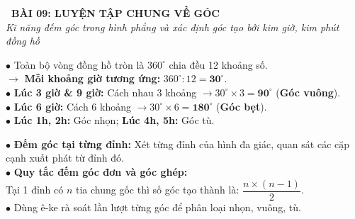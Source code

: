 \documentclass[14pt,a4paper,oneside]{extbook}
\begin{document}
\noindent
\begin{tcolorbox}[
  enhanced,
  colback=teal!8!white,
  colframe=teal!80!black,
  arc=3mm, boxrule=1pt,
  left=3mm, right=3mm, top=2mm, bottom=2mm,
  halign=center
]
  {\Large\bfseries\color{teal!90!black}\faBookmark\ BÀI 09: LUYỆN TẬP CHUNG VỀ GÓC}\\[1.5pt]
  {\footnotesize\itshape\color{black!75} Kĩ năng đếm góc trong hình phẳng và xác định góc tạo bởi kim giờ, kim phút đồng hồ}
\end{tcolorbox}

\vspace{2.5mm}

\noindent
\begin{minipage}[t]{0.49\textwidth}
  \begin{tcolorbox}[
    enhanced,
    title={\footnotesize\bfseries\color{white}\faClockO\ 1. Góc trên mặt đồng hồ},
    colback=blue!2!white,
    colframe=blue!75!black,
    arc=2.5mm, boxrule=0.8pt, top=1.8mm, bottom=1.8mm, left=2mm, right=2mm
  ]
    \footnotesize
    $\bullet$ Toàn bộ vòng đồng hồ tròn là $360^\circ$ chia đều 12 khoảng số.\\
    $\rightarrow$ \textbf{Mỗi khoảng giờ tương ứng:} $360^\circ : 12 = \textbf{30}^\circ$.\\
    $\bullet$ \textbf{Lúc 3 giờ \& 9 giờ:} Cách nhau 3 khoảng $\rightarrow 30^\circ \times 3 = \textbf{90}^\circ$ (\textbf{Góc vuông}).\\
    $\bullet$ \textbf{Lúc 6 giờ:} Cách 6 khoảng $\rightarrow 30^\circ \times 6 = \textbf{180}^\circ$ (\textbf{Góc bẹt}).\\
    $\bullet$ \textbf{Lúc 1h, 2h:} Góc nhọn; \textbf{Lúc 4h, 5h:} Góc tù.
  \end{tcolorbox}
\end{minipage}%
\hfill
\begin{minipage}[t]{0.49\textwidth}
  \begin{tcolorbox}[
    enhanced,
    title={\footnotesize\bfseries\color{white}\faObjectGroup\ 2. Kĩ thuật đếm góc trong hình},
    colback=teal!2!white,
    colframe=teal!75!black,
    arc=2.5mm, boxrule=0.8pt, top=1.8mm, bottom=1.8mm, left=2mm, right=2mm
  ]
    \footnotesize
    $\bullet$ \textbf{Đếm góc tại từng đỉnh:} Xét từng đỉnh của hình đa giác, quan sát các cặp cạnh xuất phát từ đỉnh đó.\\
    $\bullet$ \textbf{Quy tắc đếm góc đơn và góc ghép:}\\
    Tại 1 đỉnh có $n$ tia chung gốc thì số góc tạo thành là: $\dfrac{n \times (n - 1)}{2}$.\\
    $\bullet$ Dùng ê-ke rà soát lần lượt từng góc để phân loại nhọn, vuông, tù.
  \end{tcolorbox}
\end{minipage}
\end{document}

